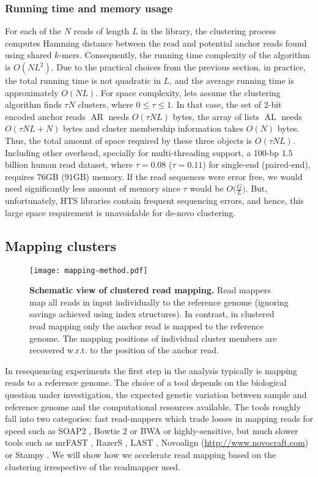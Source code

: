 \documentclass[a4paper]{article}
\DeclareMathOperator{\AR}{AR}
\DeclareMathOperator{\AL}{AL}
\begin{document}
\subsubsection{Running time and memory usage}
For each of the $N$ reads of length $L$ in the library,
the clustering process computes Hamming distance between the read and
potential anchor reads found using shared $k$-mers.
Consequently, the running time complexity of the algorithm is $O(NL^2)$.
Due to the practical choices from the previous section, in practice,
the total running time is not quadratic in $L$, and the average
running time is approximately $O(NL)$.
For space complexity, lets assume the clustering algorithm finds
$\tau N$ clusters, where $0 \le \tau \le 1$.
In that case, the set of 2-bit encoded anchor reads $\AR$ needs
$O(\tau N L)$ bytes, the array of lists $\AL$ needs
$O(\tau N L + N)$ bytes and cluster membership information takes $O(N)$
bytes. Thus, the total
amount of space required by these three objects is $O(\tau N L)$.
Including other overhead, specially for
multi-threading support, a $100$-bp $1.5$ billion human read
dataset, where $\tau=0.08$ ($\tau=0.11$) for single-end
(paired-end), requires $76$GB ($91$GB) memory.
If the read sequences were error free, we would need significantly less
amount of memory since $\tau$ would be $O\big(\frac{G}{L}\big)$.
But, unfortunately, HTS libraries contain frequent sequencing errors,
and hence, this large space requirement is unavoidable for de-novo clustering.


\subsection{Mapping clusters}

\begin{figure}
\centering
\texttt{[image: mapping-method.pdf]}
\caption{\label{fig:mapping-method}
{\bf Schematic view of clustered read mapping.}
Read mappers map all reads in input individually to the reference genome
  (ignoring savings achieved using index structures). In contrast,
  in clustered read mapping only the anchor read is mapped to the
  reference genome. The mapping positions of individual cluster members
  are recovered w.r.t. to the position of the anchor read.
}
\vspace{-4mm}
\end{figure}

In resequencing experiments the first step in the analysis typically
is mapping reads to a reference genome. The choice of a tool
depends on the biological question under investigation, the expected
genetic variation between sample and reference genome and the
computational resources available. The tools roughly fall into two
categories: fast read-mappers which trade losses in mapping
reads
for speed such as
SOAP2 \cite{Li01082009},
Bowtie 2 \cite{Langmead2012} or
BWA \cite{Li15072009}
or highly-sensitive, but much slower tools such as
mrFAST \cite{Alkan_mrFAST},
RazerS \cite{Weese01092009},
LAST \cite{Frith01042010},
Novoalign (\url{http://www.novocraft.com}) or
Stampy \cite{Lunter2011}.
We will show
how we accelerate read mapping based on the clustering irrespective of
the readmapper used.
\end{document}
